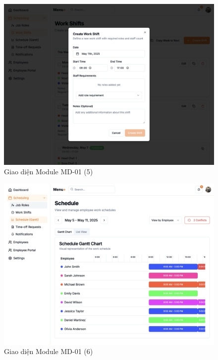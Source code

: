 \begin{figure}[H]
    \centering
    \includegraphics[width=\linewidth]{Sections/hien_thuc/img/1.5.png}
    \vspace{0.5cm}
    \caption{Giao diện Module MD-01 (5)}
    \label{fig:gantt_module_md01_5}
\end{figure}

\begin{figure}[H]
    \centering
    \includegraphics[width=\linewidth]{Sections/hien_thuc/img/1.6.png}
    \vspace{0.5cm}
    \caption{Giao diện Module MD-01 (6)}
    \label{fig:gantt_module_md01_6}
\end{figure}

